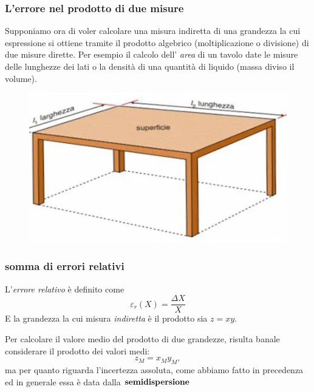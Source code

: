 \documentclass{beamer}
\theoremstyle{definition}
\theoremstyle{plain}
\begin{document}
\begin{frame}
\frametitle{L'errore nel prodotto di due misure}
Supponiamo ora di voler calcolare una misura indiretta di una grandezza la cui espressione si ottiene tramite il prodotto algebrico (moltiplicazione o divisione) di due misure dirette. Per esempio il calcolo dell' \emph{area} di un tavolo date le misure delle lunghezze dei lati o la densità di una quantità di liquido (massa diviso il volume).

\begin{figure}
  \includegraphics[width=0.8\columnwidth]{Tavola.jpg}
\end{figure}


\end{frame}

\begin{frame}
\frametitle{somma di errori relativi}
L'\emph{errore relativo} è definito come 
\begin{equation}
\varepsilon _{r} (X) = \frac{\Delta X}{X}
\label{6}
\end{equation} 
E la grandezza la cui misura \emph{indiretta} è il prodotto sia $z = xy$.

Per calcolare il valore medio del prodotto di due grandezze, risulta banale considerare il prodotto dei valori medi:
\begin{equation}
z_{M} = x_M y_M,
\label{7}
\end{equation}
ma per quanto riguarda l'incertezza assoluta, come abbiamo fatto in precedenza ed in generale essa è data dalla $\bold{semidispersione}$


\end{frame}
\end{document}
